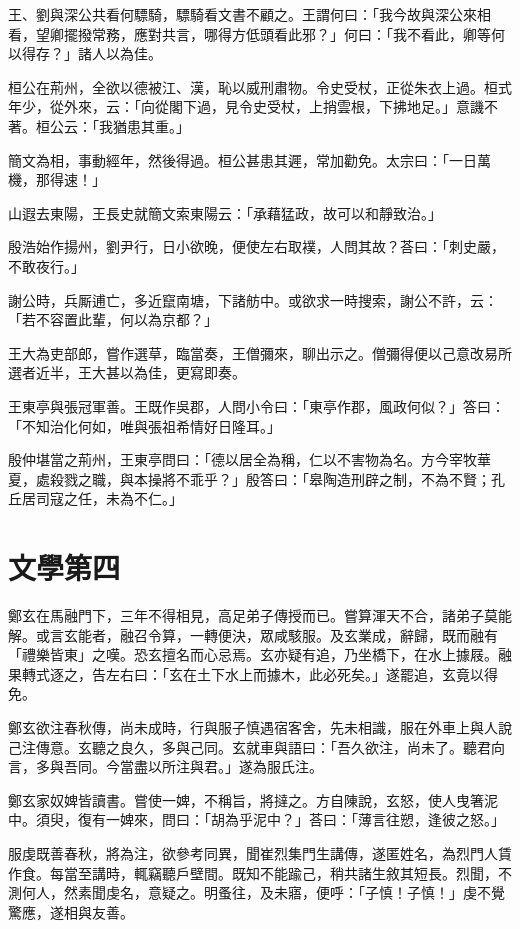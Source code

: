 王、劉與深公共看何驃騎，驃騎看文書不顧之。王謂何曰：「我今故與深公來相看，望卿擺撥常務，應對共言，哪得方低頭看此邪？」何曰：「我不看此，卿等何以得存？」諸人以為佳。

桓公在荊州，全欲以德被江、漢，恥以威刑肅物。令史受杖，正從朱衣上過。桓式年少，從外來，云：「向從閣下過，見令史受杖，上捎雲根，下拂地足。」意譏不著。桓公云：「我猶患其重。」

簡文為相，事動經年，然後得過。桓公甚患其遲，常加勸免。太宗曰：「一日萬機，那得速！」

山遐去東陽，王長史就簡文索東陽云：「承藉猛政，故可以和靜致治。」

殷浩始作揚州，劉尹行，日小欲晚，便使左右取襆，人問其故？荅曰：「刺史嚴，不敢夜行。」

謝公時，兵厮逋亡，多近竄南塘，下諸舫中。或欲求一時搜索，謝公不許，云：「若不容置此輩，何以為京都？」

王大為吏部郎，嘗作選草，臨當奏，王僧彌來，聊出示之。僧彌得便以己意改易所選者近半，王大甚以為佳，更寫即奏。

王東亭與張冠軍善。王既作吳郡，人問小令曰：「東亭作郡，風政何似？」答曰：「不知治化何如，唯與張祖希情好日隆耳。」

殷仲堪當之荊州，王東亭問曰：「德以居全為稱，仁以不害物為名。方今宰牧華夏，處殺戮之職，與本操將不乖乎？」殷答曰：「皋陶造刑辟之制，不為不賢；孔丘居司寇之任，未為不仁。」



\chapter{文學第四}

鄭玄在馬融門下，三年不得相見，高足弟子傳授而已。嘗算渾天不合，諸弟子莫能解。或言玄能者，融召令算，一轉便決，眾咸駭服。及玄業成，辭歸，既而融有「禮樂皆東」之嘆。恐玄擅名而心忌焉。玄亦疑有追，乃坐橋下，在水上據屐。融果轉式逐之，告左右曰：「玄在土下水上而據木，此必死矣。」遂罷追，玄竟以得免。

鄭玄欲注春秋傳，尚未成時，行與服子慎遇宿客舍，先未相識，服在外車上與人說己注傳意。玄聽之良久，多與己同。玄就車與語曰：「吾久欲注，尚未了。聽君向言，多與吾同。今當盡以所注與君。」遂為服氏注。

鄭玄家奴婢皆讀書。嘗使一婢，不稱旨，將撻之。方自陳說，玄怒，使人曳箸泥中。須臾，復有一婢來，問曰：「胡為乎泥中？」荅曰：「薄言往愬，逢彼之怒。」

服虔既善春秋，將為注，欲參考同異，聞崔烈集門生講傳，遂匿姓名，為烈門人賃作食。每當至講時，輒竊聽戶壁間。既知不能踰己，稍共諸生敘其短長。烈聞，不測何人，然素聞虔名，意疑之。明蚤往，及未寤，便呼：「子慎！子慎！」虔不覺驚應，遂相與友善。

